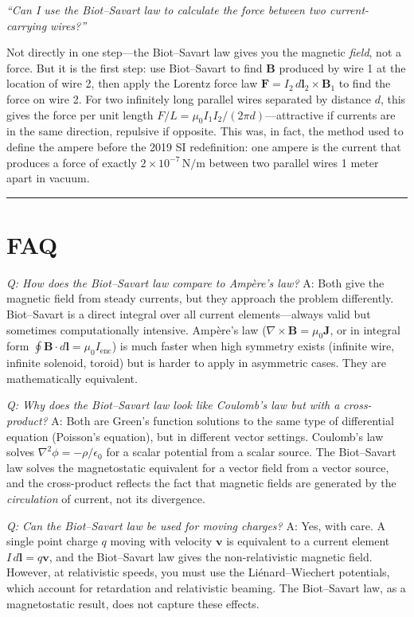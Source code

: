 \documentclass[11pt,openright]{book}
\begin{document}
\textit{``Can I use the Biot--Savart law to calculate the force between two current-carrying wires?''}

Not directly in one step---the Biot--Savart law gives you the magnetic \emph{field}, not a force. But it is the first step: use Biot--Savart to find $\mathbf{B}$ produced by wire 1 at the location of wire 2, then apply the Lorentz force law $\mathbf{F} = I_2\,d\mathbf{l}_2\times\mathbf{B}_1$ to find the force on wire 2. For two infinitely long parallel wires separated by distance $d$, this gives the force per unit length $F/L = \mu_0 I_1 I_2/(2\pi d)$---attractive if currents are in the same direction, repulsive if opposite. This was, in fact, the method used to define the ampere before the 2019 SI redefinition: one ampere is the current that produces a force of exactly $2\times 10^{-7}\,\text{N/m}$ between two parallel wires 1 meter apart in vacuum.

\bigskip
\hrule
\bigskip
\section*{FAQ}

\textit{Q: How does the Biot--Savart law compare to Ampère's law?}
A: Both give the magnetic field from steady currents, but they approach the problem differently. Biot--Savart is a direct integral over all current elements---always valid but sometimes computationally intensive. Ampère's law ($\nabla\times\mathbf{B} = \mu_0\mathbf{J}$, or in integral form $\oint\mathbf{B}\cdot d\mathbf{l} = \mu_0 I_{\text{enc}}$) is much faster when high symmetry exists (infinite wire, infinite solenoid, toroid) but is harder to apply in asymmetric cases. They are mathematically equivalent.

\textit{Q: Why does the Biot--Savart law look like Coulomb's law but with a cross-product?}
A: Both are Green's function solutions to the same type of differential equation (Poisson's equation), but in different vector settings. Coulomb's law solves $\nabla^2\phi = -\rho/\epsilon_0$ for a scalar potential from a scalar source. The Biot--Savart law solves the magnetostatic equivalent for a vector field from a vector source, and the cross-product reflects the fact that magnetic fields are generated by the \emph{circulation} of current, not its divergence.

\textit{Q: Can the Biot--Savart law be used for moving charges?}
A: Yes, with care. A single point charge $q$ moving with velocity $\mathbf{v}$ is equivalent to a current element $I\,d\mathbf{l} = q\mathbf{v}$, and the Biot--Savart law gives the non-relativistic magnetic field. However, at relativistic speeds, you must use the Liénard--Wiechert potentials, which account for retardation and relativistic beaming. The Biot--Savart law, as a magnetostatic result, does not capture these effects.
\end{document}
